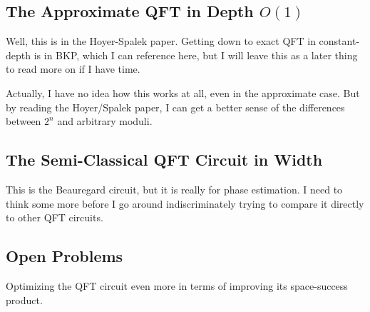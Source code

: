 \subsection{The Approximate QFT in Depth $O(1)$}

Well, this is in the Hoyer-Spalek paper. Getting down to exact QFT in 
constant-depth is in BKP, which I can reference here, but I will leave this as
a later thing to read more on if I have time.

Actually, I have no idea how this works at all, even in the approximate case.
But by reading the Hoyer/Spalek paper, I can get a better sense of the
differences between $2^n$ and arbitrary moduli.

\subsection{The Semi-Classical QFT Circuit in Width}

This is the Beauregard circuit, but it is really for phase estimation.
I need to think some more before I go around indiscriminately trying to compare
it directly to other QFT circuits.

\subsection{Open Problems}

Optimizing the QFT circuit even more in terms of improving its space-success
product. 